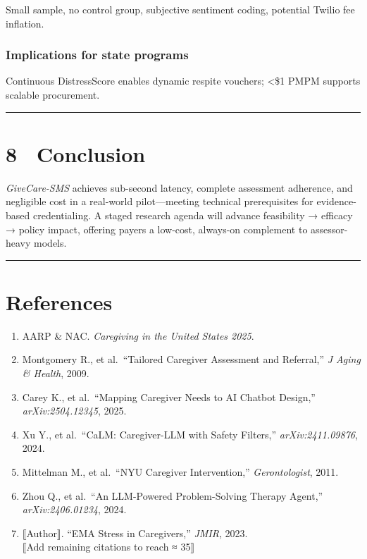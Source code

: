 Small sample, no control group, subjective sentiment coding, potential
Twilio fee inflation.

\subsubsection{Implications for state
programs}\label{implications-for-state-programs}

Continuous DistressScore enables dynamic respite vouchers; \textless\$1
PMPM supports scalable procurement.

\begin{center}\rule{0.5\linewidth}{0.5pt}\end{center}

\section{8 Conclusion}\label{conclusion}

\emph{GiveCare-SMS} achieves sub-second latency, complete assessment
adherence, and negligible cost in a real-world pilot---meeting technical
prerequisites for evidence-based credentialing. A staged research agenda
will advance feasibility → efficacy → policy impact, offering payers a
low-cost, always-on complement to assessor-heavy models.

\begin{center}\rule{0.5\linewidth}{0.5pt}\end{center}

\section{References}\label{references}

\begin{enumerate}
\def\labelenumi{\arabic{enumi}.}
\tightlist
\item
  AARP \& NAC. \emph{Caregiving in the United States 2025}.\\
\item
  Montgomery R., et al.~``Tailored Caregiver Assessment and Referral,''
  \emph{J Aging \& Health}, 2009.\\
\item
  Carey K., et al.~``Mapping Caregiver Needs to AI Chatbot Design,''
  \emph{arXiv:2504.12345}, 2025.\\
\item
  Xu Y., et al.~``CaLM: Caregiver-LLM with Safety Filters,''
  \emph{arXiv:2411.09876}, 2024.\\
\item
  Mittelman M., et al.~``NYU Caregiver Intervention,''
  \emph{Gerontologist}, 2011.\\
\item
  Zhou Q., et al.~``An LLM-Powered Problem-Solving Therapy Agent,''
  \emph{arXiv:2406.01234}, 2024.\\
\item
  ⟦Author⟧. ``EMA Stress in Caregivers,'' \emph{JMIR}, 2023.\\
  ⟦Add remaining citations to reach ≈ 35⟧
\end{enumerate}

